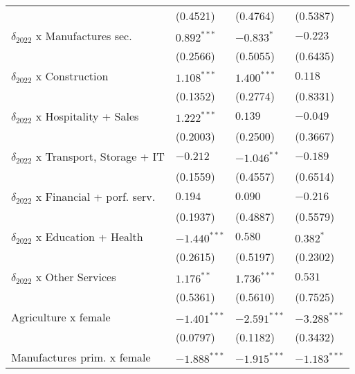 \begin{tabular}{llll}
                                                   &        (0.4521) &        (0.4764) &        (0.5387) \\
$\delta_{2022}$ x Manufactures sec.                &   $0.892^{***}$ &      $-0.833^*$ &        $-0.223$ \\
                                                   &        (0.2566) &        (0.5055) &        (0.6435) \\
$\delta_{2022}$ x Construction                     &   $1.108^{***}$ &   $1.400^{***}$ &         $0.118$ \\
                                                   &        (0.1352) &        (0.2774) &        (0.8331) \\
$\delta_{2022}$ x Hospitality + Sales              &   $1.222^{***}$ &         $0.139$ &        $-0.049$ \\
                                                   &        (0.2003) &        (0.2500) &        (0.3667) \\
$\delta_{2022}$ x Transport, Storage + IT          &        $-0.212$ &   $-1.046^{**}$ &        $-0.189$ \\
                                                   &        (0.1559) &        (0.4557) &        (0.6514) \\
$\delta_{2022}$ x Financial + porf. serv.          &         $0.194$ &         $0.090$ &        $-0.216$ \\
                                                   &        (0.1937) &        (0.4887) &        (0.5579) \\
$\delta_{2022}$ x Education + Health               &  $-1.440^{***}$ &         $0.580$ &       $0.382^*$ \\
                                                   &        (0.2615) &        (0.5197) &        (0.2302) \\
$\delta_{2022}$ x Other Services                   &    $1.176^{**}$ &   $1.736^{***}$ &         $0.531$ \\
                                                   &        (0.5361) &        (0.5610) &        (0.7525) \\
Agriculture x female                               &  $-1.401^{***}$ &  $-2.591^{***}$ &  $-3.288^{***}$ \\
                                                   &        (0.0797) &        (0.1182) &        (0.3432) \\
Manufactures prim. x female                        &  $-1.888^{***}$ &  $-1.915^{***}$ &  $-1.183^{***}$ \\

\end{tabular}

